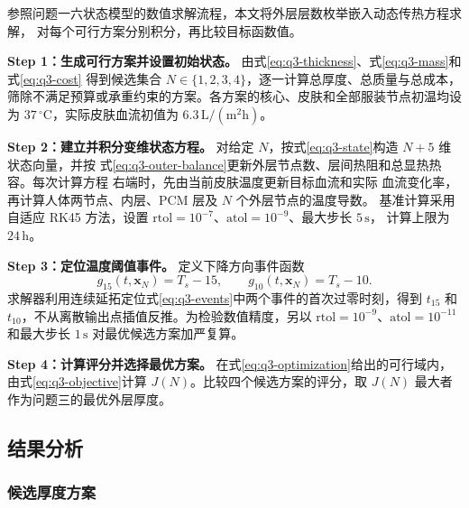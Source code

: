 \documentclass[withoutpreface,bwprint]{cumcmthesis}
\begin{document}
参照问题一六状态模型的数值求解流程，本文将外层层数枚举嵌入动态传热方程求解，
对每个可行方案分别积分，再比较目标函数值。

\par\noindent\textbf{Step 1：生成可行方案并设置初始状态。}
由式\eqref{eq:q3-thickness}、式\eqref{eq:q3-mass}和式\eqref{eq:q3-cost}
得到候选集合 $N\in\{1,2,3,4\}$，逐一计算总厚度、总质量与总成本，
筛除不满足预算或承重约束的方案。各方案的核心、皮肤和全部服装节点初温均设为
$37\,^{\circ}\mathrm C$，实际皮肤血流初值为
$6.3\,\mathrm{L/(m^2h)}$。

\par\noindent\textbf{Step 2：建立并积分变维状态方程。}
对给定 $N$，按式\eqref{eq:q3-state}构造 $N+5$ 维状态向量，并按
式\eqref{eq:q3-outer-balance}更新外层节点数、层间热阻和总显热热容。每次计算方程
右端时，先由当前皮肤温度更新目标血流和实际
血流变化率，再计算人体两节点、内层、PCM 层及 $N$ 个外层节点的温度导数。
基准计算采用自适应 RK45 方法，设置
$\mathrm{rtol}=10^{-7}$、$\mathrm{atol}=10^{-9}$、最大步长 $5\,\mathrm s$，
计算上限为 $24\,\mathrm h$。

\par\noindent\textbf{Step 3：定位温度阈值事件。}
定义下降方向事件函数
\begin{equation}
    g_{15}(t,\bm x_N)=T_s-15,\qquad
    g_{10}(t,\bm x_N)=T_s-10.
\label{eq:q3-events}
\end{equation}
求解器利用连续延拓定位式\eqref{eq:q3-events}中两个事件的首次过零时刻，得到
$t_{15}$ 和 $t_{10}$，不从离散输出点插值反推。为检验数值精度，另以
$\mathrm{rtol}=10^{-9}$、$\mathrm{atol}=10^{-11}$ 和最大步长 $1\,\mathrm s$
对最优候选方案加严复算。

\par\noindent\textbf{Step 4：计算评分并选择最优方案。}
在式\eqref{eq:q3-optimization}给出的可行域内，由式\eqref{eq:q3-objective}计算
$J(N)$。比较四个候选方案的评分，取
$J(N)$ 最大者作为问题三的最优外层厚度。

\subsection{结果分析}

\subsubsection{候选厚度方案}
\end{document}
